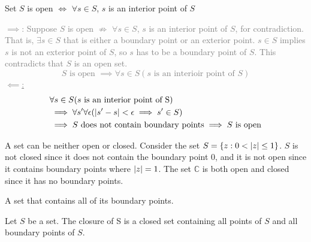 \documentclass[12pt, english]{book}
\makeatletter
\renewenvironment{proof}[1][\proofname]{\par
	\pushQED{\qed}%
	\normalfont \topsep6\p@\@plus6\p@\relax
	\list{}{%
		\settowidth{\leftmargin}{\itshape\proofname:\hskip\labelsep}%
		\setlength{\labelwidth}{0pt}%
		\setlength{\itemindent}{-\leftmargin}%
	}%
	\item[\hskip\labelsep\itshape#1\@addpunct{:}]\ignorespaces
}{%
	\popQED\endlist\@endpefalse
}
\makeatother
\begin{document}
	\begin{theorem}
		Set $S$ is open $\iff$ $\forall s \in S$, $s$ is an interior point of $S$ 
	\end{theorem}
	\begin{proof}
		\textcolor{Grey}{
		\underline{$\implies$}:
		Suppose $S$ is open $\nRightarrow$ $\forall s \in S$, $s$ is an interior point of $S$, for contradiction. That is, $\exists s \in S$ that is either a boundary point or an exterior point. $s \in S$ implies $s$ is not an exterior point of $S$, so $s$ has to be a boundary point of $S$. This contradicts that $S$ is an open set. 
		$$S \text{ is open } \implies \forall s \in S (s \text{ is an interioir point of }S)$$
		\underline{$\impliedby$:}
		\begin{align*}
			&\forall s \in S (s \text{ is an interior point of S}) \\
			&\implies \forall s' \forall \epsilon (\abs{s'-s} < \epsilon \implies s' \in S)\\
			&\implies S \text{ does not contain boundary points} \implies S \text{ is open}
		\end{align*}
		}
	\end{proof}

	A set can be neither open or closed. Consider the set $S = \{z : 0 < \abs{z} \leq 1\}$. $S$ is not closed since it does not contain the boundary point $0$, and it is not open since it contains boundary points where $\abs{z} = 1$. The set $\mathbb{C}$ is both open and closed since it has no boundary points. 
	
	\begin{definition}
		A set that contains all of its boundary points. 
	\end{definition}

	\begin{definition}
		Let $S$ be a set. The closure of S is a closed set containing all points of $S$ and all boundary points of $S$. 
	\end{definition}
\end{document}
